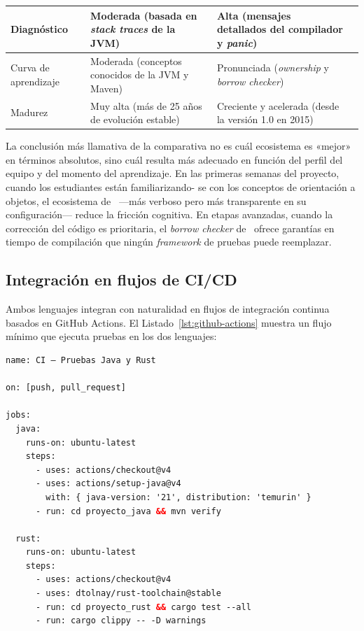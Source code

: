 \begin{longtable}{@{} L{3cm} L{4.5cm} L{4.5cm} L{1.5cm} @{}}
	Diagnóstico & 
	Moderada (basada en \textit{stack traces} de la JVM) & 
	Alta (mensajes detallados del compilador y \textit{panic}) & 
	\rust \\
	\midrule
	
	Curva de aprendizaje & 
	Moderada (conceptos conocidos de la JVM y Maven) & 
	Pronunciada (\textit{ownership} y \textit{borrow checker}) & 
	\java \\
	\midrule
	
	Madurez & 
	Muy alta (más de 25 años de evolución estable) & 
	Creciente y acelerada (desde la versión 1.0 en 2015) & 
	\java \\
\end{longtable}
\endgroup

\noindent
La conclusión más llamativa de la comparativa no es cuál ecosistema es «mejor» en términos
absolutos, sino cuál resulta más adecuado en función del perfil del equipo y del momento del
aprendizaje. En las primeras semanas del proyecto, cuando los estudiantes están familiarizando-
se con los conceptos de orientación a objetos, el ecosistema de \java\ ---más verboso pero
más transparente en su configuración--- reduce la fricción cognitiva. En etapas avanzadas,
cuando la corrección del código es prioritaria, el \textit{borrow checker} de \rust\ ofrece
garantías en tiempo de compilación que ningún \textit{framework} de pruebas puede reemplazar.

\subsection{Integración en flujos de CI/CD}
\label{subsec:cicd}

Ambos lenguajes integran con naturalidad en flujos de integración continua basados en
GitHub Actions. El Listado~\ref{lst:github-actions} muestra un flujo mínimo que ejecuta
pruebas en los dos lenguajes:

\begin{lstlisting}[style=javaStyle,
  caption={Flujo de GitHub Actions para pruebas en \java\ y \rust\ simultáneamente.},
  label={lst:github-actions},
  language=XML]
name: CI — Pruebas Java y Rust

on: [push, pull_request]

jobs:
  java:
    runs-on: ubuntu-latest
    steps:
      - uses: actions/checkout@v4
      - uses: actions/setup-java@v4
        with: { java-version: '21', distribution: 'temurin' }
      - run: cd proyecto_java && mvn verify

  rust:
    runs-on: ubuntu-latest
    steps:
      - uses: actions/checkout@v4
      - uses: dtolnay/rust-toolchain@stable
      - run: cd proyecto_rust && cargo test --all
      - run: cargo clippy -- -D warnings
\end{lstlisting}


